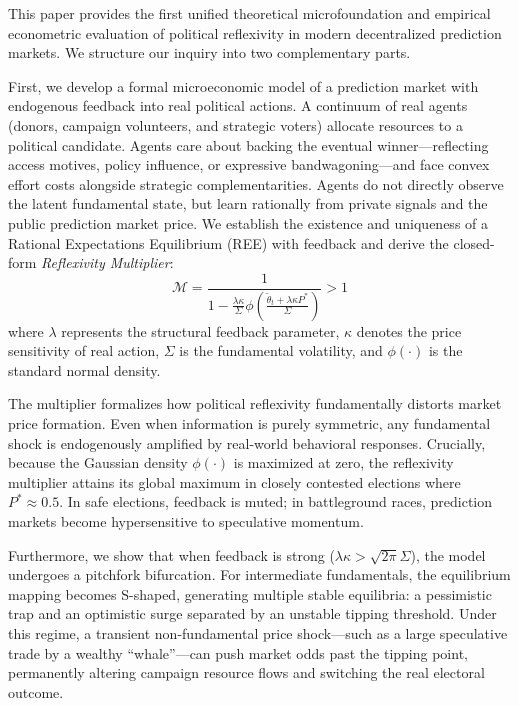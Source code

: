 \documentclass[12pt]{article}
\begin{document}
This paper provides the first unified theoretical microfoundation and empirical econometric evaluation of political reflexivity in modern decentralized prediction markets. We structure our inquiry into two complementary parts.

First, we develop a formal microeconomic model of a prediction market with endogenous feedback into real political actions. A continuum of real agents (donors, campaign volunteers, and strategic voters) allocate resources to a political candidate. Agents care about backing the eventual winner—reflecting access motives, policy influence, or expressive bandwagoning—and face convex effort costs alongside strategic complementarities. Agents do not directly observe the latent fundamental state, but learn rationally from private signals and the public prediction market price. We establish the existence and uniqueness of a Rational Expectations Equilibrium (REE) with feedback and derive the closed-form \textit{Reflexivity Multiplier}:
\begin{equation}
\mathcal{M} = \frac{1}{1 - \frac{\lambda \kappa}{\Sigma} \phi\left( \frac{\tilde{\theta}_t + \lambda \kappa P^*}{\Sigma} \right)} > 1
\end{equation}
where $\lambda$ represents the structural feedback parameter, $\kappa$ denotes the price sensitivity of real action, $\Sigma$ is the fundamental volatility, and $\phi(\cdot)$ is the standard normal density. 

The multiplier formalizes how political reflexivity fundamentally distorts market price formation. Even when information is purely symmetric, any fundamental shock is endogenously amplified by real-world behavioral responses. Crucially, because the Gaussian density $\phi(\cdot)$ is maximized at zero, the reflexivity multiplier attains its global maximum in closely contested elections where $P^* \approx 0.5$. In safe elections, feedback is muted; in battleground races, prediction markets become hypersensitive to speculative momentum. 

Furthermore, we show that when feedback is strong ($\lambda \kappa > \sqrt{2\pi}\Sigma$), the model undergoes a pitchfork bifurcation. For intermediate fundamentals, the equilibrium mapping becomes S-shaped, generating multiple stable equilibria: a pessimistic trap and an optimistic surge separated by an unstable tipping threshold. Under this regime, a transient non-fundamental price shock—such as a large speculative trade by a wealthy ``whale''—can push market odds past the tipping point, permanently altering campaign resource flows and switching the real electoral outcome.
\end{document}
